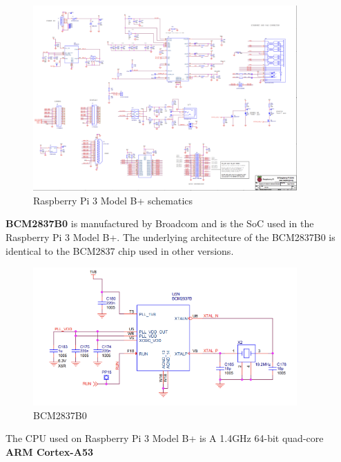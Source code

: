 \documentclass[12pt]{article}
\begin{document}
\begin{figure}[ht]
    \centering
    \includegraphics[width=0.9\textwidth]{images/image8.png}
    \caption{Raspberry Pi 3 Model B+ schematics}
    \label{fig:pic1}
\end{figure}  

\textbf{BCM2837B0} is manufactured by Broadcom and is the SoC used in the Raspberry Pi 3 Model B+. The underlying architecture of the BCM2837B0 is identical to the BCM2837 chip used in other versions.\\

\newpage

\begin{figure}[ht]
    \centering
    \includegraphics[width=0.9\textwidth]{images/image6.png}
    \caption{BCM2837B0}
    \label{fig:pic2}
\end{figure} 

The CPU used on Raspberry Pi 3 Model B+ is A 1.4GHz 64-bit quad-core \textbf{ARM Cortex-A53}\\
\end{document}
